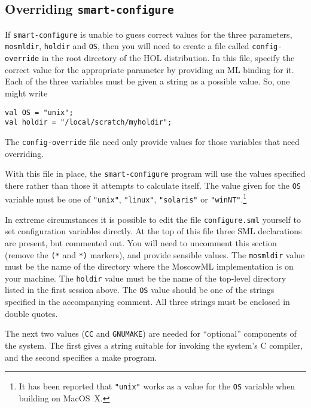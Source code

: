 \subsection{Overriding \texttt{smart-configure}}
\label{sec:editting-configure}

If \texttt{smart-configure} is unable to guess correct values for the
three parameters, \texttt{mosmldir}, \texttt{holdir} and \texttt{OS},
then you will need to create a file called \texttt{config-override} in
the root directory of the HOL distribution.  In this file, specify the
correct value for the appropriate parameter by providing an ML binding
for it.  Each of the three variables must be given a string as a
possible value.  So, one might write

\begin{session}
\begin{verbatim}
val OS = "unix";
val holdir = "/local/scratch/myholdir";
\end{verbatim}
\end{session}

The \texttt{config-override} file need only provide values for those
variables that need overriding.

With this file in place, the \texttt{smart-configure} program will use
the values specified there rather than those it attempts to calculate
itself.  The value given for the \texttt{OS} variable must be one of
\texttt{"unix"}, \texttt{"linux"}, \texttt{"solaris"} or
\texttt{"winNT"}.\footnote{It has been reported that \texttt{"unix"}
  works as a value for the \texttt{OS} variable when building on
  MacOS~X.}

In extreme circumstances it is possible to edit the file
\texttt{configure.sml} yourself to set configuration variables
directly.  At the top of this file three SML declarations are present,
but commented out.  You will need to uncomment this section (remove
the \texttt{(*} and \texttt{*)} markers), and provide sensible values.
The \texttt{mosmldir} value must be the name of the directory where
the MoscowML implementation is on your machine.  The \texttt{holdir}
value must be the name of the top-level directory listed in the first
session above.  The \texttt{OS} value should be one of the strings
specified in the accompanying comment.  All three strings must be
enclosed in double quotes.

The next two values (\texttt{CC} and \texttt{GNUMAKE}) are needed for
``optional'' components of the system.  The first gives a string
suitable for invoking the system's C compiler, and the second
specifies a \textsf{make} program.

